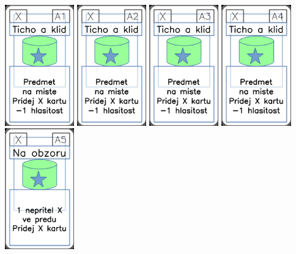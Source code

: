 \documentclass[a4paper]{article}
\begin{document}
	\includegraphics[width=3.0cm]{img-5_0}
	\includegraphics[width=3.0cm]{img-5_1}
	\includegraphics[width=3.0cm]{img-5_2}
	\includegraphics[width=3.0cm]{img-5_3}
	\includegraphics[width=3.0cm]{img-5_4}
\end{document}
